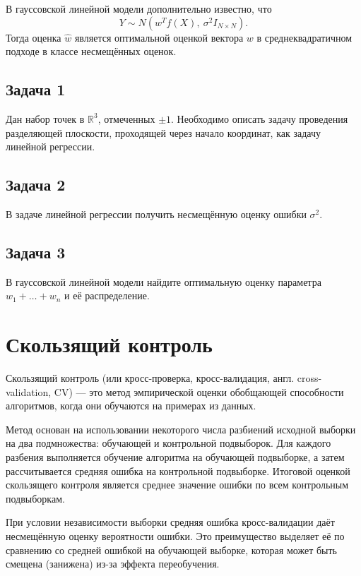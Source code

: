 В гауссовской линейной модели дополнительно известно, что
\[
    Y \sim N\left( w^Tf(X),\ \sigma^2 I_{N\times N} \right).
\]
Тогда оценка $\hat{w}$ является оптимальной оценкой вектора $w$ в среднеквадратичном подходе в классе несмещённых оценок.

\subsection*{Задача 1}

    Дан набор точек в $\mathbb{R}^3$, отмеченных $\pm1$.
    Необходимо описать задачу проведения разделяющей плоскости, проходящей через начало координат, как задачу линейной регрессии.

\subsection*{Задача 2}

    В задаче линейной регрессии получить несмещённую оценку ошибки $\sigma^2$.
    
\subsection*{Задача 3}

    В гауссовской линейной модели найдите оптимальную оценку параметра $w_1 + \ldots +w_n$ и её распределение.

\section{Скользящий контроль}

Скользящий контроль (или кросс-проверка, кросс-валидация, англ. cross-validation, CV) — это метод эмпирической оценки  обобщающей способности алгоритмов, когда они обучаются на примерах из данных.

Метод основан на использовании некоторого числа разбиений исходной выборки на два подмножества: обучающей и контрольной подвыборок. Для каждого разбения выполняется обучение алгоритма на обучающей подвыборке, а затем рассчитывается средняя ошибка на контрольной подвыборке. Итоговой оценкой скользящего контроля является среднее значение ошибки по всем контрольным подвыборкам.

При условии независимости выборки средняя ошибка кросс-валидации даёт несмещённую оценку вероятности ошибки. Это преимущество выделяет её по сравнению со средней ошибкой на обучающей выборке, которая может быть смещена (занижена) из-за эффекта переобучения.

